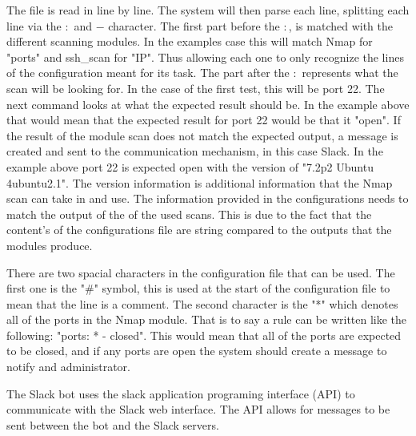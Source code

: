 \documentclass[12pt]{article}
\begin{document}
The file is read in line by line. The system will then parse each line, splitting each line via the $:$ and $-$ character. The first part before the $:$, is matched with the different scanning modules. In the examples case this will match Nmap for "ports" and ssh\_scan for "IP".  Thus allowing each one to only recognize the lines of the configuration meant for its task. The part after the $:$ represents what the scan will be looking for. In the case of the first test, this will be port 22. The next command looks at what the expected result should be. In the example above that would mean that the expected result for port 22 would be that it "open". If the result of the module scan does not match the expected output, a message is created and sent to the communication mechanism, in this case Slack. In the example above port 22 is expected open with the version of "7.2p2 Ubuntu 4ubuntu2.1". The version information is additional information that the Nmap scan can take in and use. The information provided in the configurations needs to match the output of the of the used scans. This is due to the fact that the content's of the configurations file are string compared to the outputs that the modules produce.

There are two spacial characters in the configuration file that can be used. The first one is the "\#" symbol, this is used at the start of the configuration file to mean that the line is a comment. The second character is the "*" which denotes all of the ports in the Nmap module. That is to say a rule can be written like the following: "ports: * - closed". This would mean that all of the ports are expected to be closed, and if any ports are open the system should create a message to notify and administrator.

The Slack bot uses the slack application programing interface (API) to communicate with the Slack web interface. The API allows for messages to be sent between the bot and the Slack servers.
\end{document}
